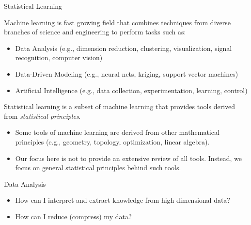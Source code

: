 \documentclass[9pt]{beamer}
\begin{document}
%
\begin{frame}{Statistical Learning}

\begin{block}{}
Machine learning is fast growing field that combines techniques from diverse branches of science and engineering to perform tasks such as:
\end{block}
\begin{itemize}
\item Data Analysis (e.g., dimension reduction, clustering, visualization, signal recognition, computer vision)
\item Data-Driven Modeling (e.g., neural nets, kriging, support vector machines)
\item Artificial Intelligence (e.g., data collection, experimentation, learning, control)
\end{itemize}
\begin{block}{}
Statistical learning is a subset of machine learning that provides tools derived from {\em statistical principles}. 
\end{block}
\begin{itemize}
\item Some tools of machine learning are derived from other mathematical principles (e.g., geometry, topology, optimization, linear algebra). 
\item Our focus here is not to provide an extensive review of all tools. Instead, we focus on general statistical principles behind such tools.  
\end{itemize}
\end{frame}


%
\begin{frame}{Data Analysis}

\begin{block}{}
\begin{itemize}
\item How can I interpret and extract knowledge from high-dimensional data? 

\item How can I reduce (compress) my data? 
\end{itemize}
\end{block}

\end{frame}
\end{document}
